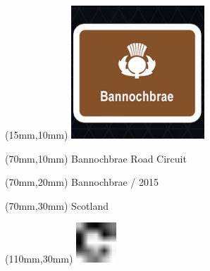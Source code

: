 \null\newpage
\begin{textblock*}{50mm}(15mm,10mm)%
\includegraphics[width=50mm]{LG/BANN.png}
\end{textblock*}
\begin{textblock*}{130mm}(70mm,10mm)%
{\fontsize{20}{20}\selectfont Bannochbrae Road Circuit}\\
\end{textblock*}
\begin{textblock*}{120mm}(70mm,20mm)%
{\fontsize{16}{16}\selectfont Bannochbrae / 2015}\\
\end{textblock*}
\begin{textblock*}{120mm}(70mm,30mm)%
{\fontsize{12}{12}\selectfont Scotland}
\end{textblock*}
\begin{textblock*}{30mm}(110mm,30mm)%
\centering
\includegraphics[height=15mm]{icons/fa-rotate-right.pdf}
\end{textblock*}
